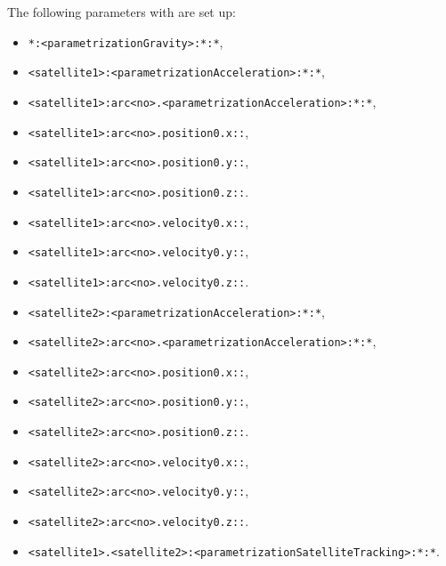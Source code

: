 The following parameters with  are set up:
\begin{itemize}
\item \verb|*:<parametrizationGravity>:*:*|,
\item \verb|<satellite1>:<parametrizationAcceleration>:*:*|,
\item \verb|<satellite1>:arc<no>.<parametrizationAcceleration>:*:*|,
\item \verb|<satellite1>:arc<no>.position0.x::|,
\item \verb|<satellite1>:arc<no>.position0.y::|,
\item \verb|<satellite1>:arc<no>.position0.z::|.
\item \verb|<satellite1>:arc<no>.velocity0.x::|,
\item \verb|<satellite1>:arc<no>.velocity0.y::|,
\item \verb|<satellite1>:arc<no>.velocity0.z::|.
\item \verb|<satellite2>:<parametrizationAcceleration>:*:*|,
\item \verb|<satellite2>:arc<no>.<parametrizationAcceleration>:*:*|,
\item \verb|<satellite2>:arc<no>.position0.x::|,
\item \verb|<satellite2>:arc<no>.position0.y::|,
\item \verb|<satellite2>:arc<no>.position0.z::|.
\item \verb|<satellite2>:arc<no>.velocity0.x::|,
\item \verb|<satellite2>:arc<no>.velocity0.y::|,
\item \verb|<satellite2>:arc<no>.velocity0.z::|.
\item \verb|<satellite1>.<satellite2>:<parametrizationSatelliteTracking>:*:*|.
\end{itemize}


